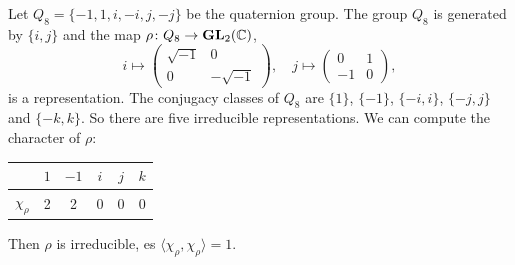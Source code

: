 \begin{example}



\end{example}

\begin{example}
    Let $Q_8=\{-1,1,i,-i,j,-j\}$ be the quaternion group. 
    The group $Q_8$ is generated by $\{i,j\}$ and the map $\rho\colon Q_8\to\mathbf{GL}_2(\mathbb{C})$, 
    \[
    i\mapsto\begin{pmatrix}
    \sqrt{-1}&0\\0&-\sqrt{-1}
    \end{pmatrix},
    \quad
    j\mapsto\begin{pmatrix}
    0&1\\-1&0
    \end{pmatrix},
    \]
    is a representation.
    The conjugacy classes of $Q_8$ are $\{1\}$, $\{-1\}$, $\{-i,i\}$, $\{-j,j\}$ and $\{-k,k\}$. 
    So there are five irreducible representations. 
    We can compute the character of $\rho$:
    	\begin{center}
		\begin{tabular}{|c|c|c|c|c|c|}
		    \hline
			& $1$ & $-1$ & $i$ & $j$ & $k$\tabularnewline
			\hline
			$\chi_\rho$ & 2 & 2 & 0 & 0 & 0\tabularnewline
			\hline
		\end{tabular}
	\end{center}
	Then $\rho$ is irreducible, es $\langle\chi_\rho,\chi_\rho\rangle=1$. 
	

\end{example}
